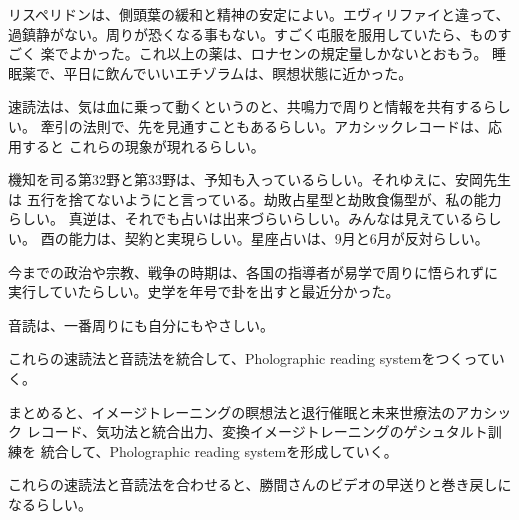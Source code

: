 \documentclass{jsarticle}
\begin{document}
リスペリドンは、側頭葉の緩和と精神の安定によい。エヴィリファイと違って、
過鎮静がない。周りが恐くなる事もない。すごく屯服を服用していたら、ものすごく
楽でよかった。これ以上の薬は、ロナセンの規定量しかないとおもう。
睡眠薬で、平日に飲んでいいエチゾラムは、瞑想状態に近かった。

速読法は、気は血に乗って動くというのと、共鳴力で周りと情報を共有するらしい。
牽引の法則で、先を見通すこともあるらしい。アカシックレコードは、応用すると
これらの現象が現れるらしい。

機知を司る第32野と第33野は、予知も入っているらしい。それゆえに、安岡先生は
五行を捨てないようにと言っている。劫敗占星型と劫敗食傷型が、私の能力らしい。
真逆は、それでも占いは出来づらいらしい。みんなは見えているらしい。
酉の能力は、契約と実現らしい。星座占いは、9月と6月が反対らしい。

今までの政治や宗教、戦争の時期は、各国の指導者が易学で周りに悟られずに
実行していたらしい。史学を年号で卦を出すと最近分かった。

音読は、一番周りにも自分にもやさしい。

これらの速読法と音読法を統合して、Pholographic reading systemをつくっていく。

まとめると、イメージトレーニングの瞑想法と退行催眠と未来世療法のアカシック
レコード、気功法と統合出力、変換イメージトレーニングのゲシュタルト訓練を
統合して、Pholographic reading systemを形成していく。 

これらの速読法と音読法を合わせると、勝間さんのビデオの早送りと巻き戻しに
なるらしい。
\end{document}
